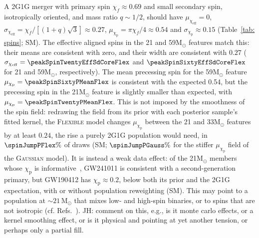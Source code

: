 \documentclass[%
    aps,
    prl,
    reprint,
    superscriptaddress,
    nolongbibliography,
    nobibnotes,
    nofootinbib,
    linenumbers,
    amsmath,amssymb,
]{revtex4-2}
\newcommand{\Msun}{\ensuremath{\mathrm{M}_{\odot}}}
\newcommand{\chieff}{\ensuremath{\chi_{\mathrm{eff}}}}
\newcommand{\chip}{\ensuremath{\chi_{\mathrm{p}}}}
\newcommand{\twoGoneG}{\ac{2G1G}\xspace}
\newcommand{\red}[1]{{\color{Red} #1}}
\newcommand{\jh}[1]{{\color{orange}JH: #1}}
\newcommand{\flexiblespins}{\textsc{Flexible}\xspace}
\newcommand{\gaussianspins}{\textsc{Gaussian}\xspace}
\newcommand{\featTwenty}{21\xspace}
\newcommand{\featThirtyFive}{33\xspace}
\newcommand{\featSixty}{59\xspace}
\begin{document}
A \twoGoneG merger with primary spin $\chi_f \approx 0.69$ and small secondary spin, isotropically oriented, and mass ratio $q\sim1/2$, should have $\mu_{\chieff} = 0$, $\sigma_{\chieff} = \chi_f/[(1 + q)\sqrt{3}] \approx 0.27$, $\mu_{\chip} = \pi\chi_f/4 \approx 0.54$ and $\sigma_{\chip} \approx 0.15$ (Table~\ref{tab: spins}; SM). The effective aligned spins in the \featTwenty and \featSixty $\Msun$ features match this: their means are consistent with zero, and their width are consistent with $0.27$ ($\sigma_{\chieff} = \peakSpinTwentyEffSdCoreFlex$ and $\peakSpinSixtyEffSdCoreFlex$ for \featTwenty and \featSixty $\Msun$, respectively). The mean precessing spin for the \featSixty $\Msun$ feature $\mu_{\chip} = \peakSpinSixtyPMeanFlex$ is consistent with the expected 0.54, but the precessing spin in the \featTwenty $\Msun$ feature is slightly smaller than expected, with $\mu_{\chip} = \peakSpinTwentyPMeanFlex$. \red{This is not imposed by the smoothness of the spin field: redrawing the field from its prior with each posterior sample's fitted kernel, the \flexiblespins model changes $\mu_{\chip}$ between the \featTwenty and \featThirtyFive $\Msun$ features by at least $0.24$, the rise a purely \twoGoneG population would need, in $\spinJumpPFlex\%$ of draws (SM; $\spinJumpPGauss\%$ for the stiffer $\mu_{\chip}$ field of the \gaussianspins model). It is instead a weak data effect: of the \featTwenty $\Msun$ members whose $\chip$ is informative~\cite{Plunkett:2026aiq}, GW241011 is consistent with a second-generation primary, but GW190412 has $\chip \approx 0.2$, below both its prior and the \twoGoneG expectation, with or without population reweighting (SM). This may point to a population at $\sim \featTwenty\,\Msun$ that mixes low- and high-spin binaries, or to spins that are not isotropic (cf. Refs.~\cite{antonini_inferring_2025, Tong:2025xir, Plunkett:2026pxt}).} \jh{comment on this, e.g., is it monte carlo effects, or a kernel smoothing effect, or is it physical and pointing at yet another tension, or perhaps only a partial fill}. %
\end{document}
